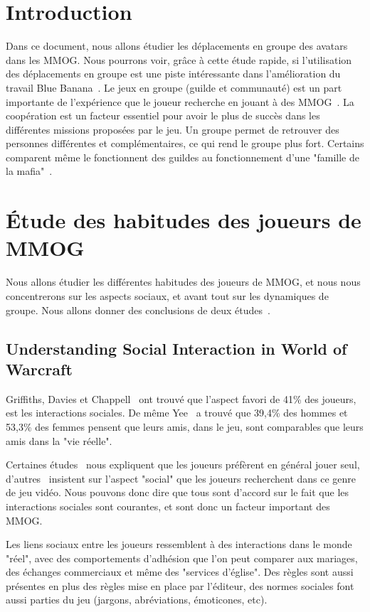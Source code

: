 \documentclass[11pt,a4paper]{article}
\begin{document}

\newpage
\tableofcontents
\newpage



\section{Introduction}
Dans ce document, nous allons étudier les déplacements en groupe des avatars dans les MMOG. Nous pourrons voir, grâce à cette étude rapide, si l'utilisation des déplacements en groupe est une piste intéressante dans l'amélioration du travail Blue Banana~\cite{191}. Le jeux en groupe (guilde et communauté) est un part importante de l'expérience que le joueur recherche en jouant à des MMOG~\cite{1501834,1255052}. La coopération est un facteur essentiel pour avoir le plus de succès dans les différentes missions proposées par le jeu. Un groupe permet de retrouver des personnes différentes et complémentaires, ce qui rend le groupe plus fort. Certains comparent même le fonctionnent des guildes au fonctionnement d'une "famille de la mafia"~\cite{Jakobsson03thesopranos}.


\newpage
\section{Étude des habitudes des joueurs de MMOG}
Nous allons étudier les différentes habitudes des joueurs de MMOG, et nous nous concentrerons sur les aspects sociaux, et avant tout sur les dynamiques de groupe. Nous allons donner des conclusions de deux études~\cite{1255052,StudyEQ}.

\subsection{Understanding Social Interaction in World of Warcraft}

Griffiths, Davies et Chappell~\cite{BreakingSteretype} ont trouvé que l'aspect favori de 41\% des joueurs, est les interactions sociales. De même Yee~\cite{1159988} a trouvé que 39,4\% des hommes et 53,3\% des femmes pensent que leurs amis, dans le jeu, sont comparables que leurs amis dans la "vie réelle".
\par Certaines études~\cite{1124834,1031667} nous expliquent que les joueurs préfèrent en général jouer seul, d'autres~\cite{1159988,Jakobsson03thesopranos} insistent sur l'aspect "social" que les joueurs recherchent dans ce genre de jeu vidéo. Nous pouvons donc dire que tous sont d'accord sur le fait que les interactions sociales sont courantes, et sont donc un facteur important des MMOG.
\par Les liens sociaux entre les joueurs ressemblent à des interactions dans le monde "réel", avec des comportements d'adhésion que l'on peut comparer aux mariages, des échanges commerciaux et même des "services d'église". Des règles sont aussi présentes en plus des règles mise en place par l'éditeur, des normes sociales font aussi parties du jeu (jargons, abréviations, émoticones, etc).
\end{document}
